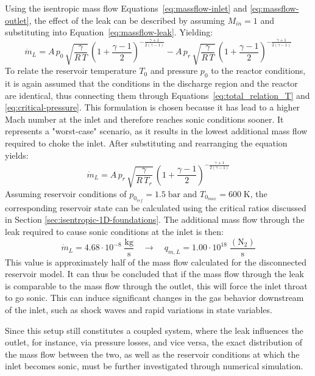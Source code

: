 	Using the isentropic mass flow Equations~\eqref{eq:massflow-inlet} and \eqref{eq:massflow-outlet}, the effect of the leak can be described by assuming $M_{in} = 1$ and substituting into Equation~\eqref{eq:massflow-leak}.
	Yielding:
	$$
	    \dot{m}_L =
	    A\, p_0\, \sqrt{\frac{\gamma}{R\,T}}\, \left(1+\frac{\gamma-1}{2}\right)^{-\frac{\gamma+1}{2(\gamma-1)}}
	    - A\, p_r\, \sqrt{\frac{\gamma}{R\,T}}\, \left(1+\frac{\gamma-1}{2}\right)^{-\frac{\gamma+1}{2(\gamma-1)}}
	$$
	To relate the reservoir temperature $T_0$ and pressure $p_0$ to the reactor conditions, it is again assumed that the conditions in the discharge region and the reactor are identical, thus connecting them through Equations~\eqref{eq:total_relation_T} and \eqref{eq:critical-pressure}.
	This formulation is chosen because it has lead to a higher Mach number at the inlet and therefore reaches sonic conditions sooner.
	It represents a "worst-case" scenario, as it results in the lowest additional mass flow required to choke the inlet.
	After substituting and rearranging the equation yields:
	\begin{equation}
	    \dot{m}_L =
	    A\, p_r\, \sqrt{\frac{\gamma}{R\, T_r}}\,
	    \left(1 + \frac{\gamma - 1}{2}\right)^{-\frac{\gamma + 1}{2(\gamma - 1)}}
	\end{equation}
	Assuming reservoir conditions of $p_{0_{ref}} = 1.5\;\text{bar}$ and $T_{0_{max}} = 600\;\text{K}$, the corresponding reservoir state can be calculated using the critical ratios discussed in Section \ref{sec:isentropic-1D-foundations}.
	The additional mass flow through the leak required to cause sonic conditions at the inlet is then:
	$$
	    \dot{m}_L = 4.68 \cdot 10^{-8} \; \frac{\text{kg}}{\text{s}}
			\quad \rightarrow \quad
		q_{m,L} = 1.00 \cdot 10^{18} \; \frac{(\text{N}_2)}{\text{s}}
	$$
	This value is approximately half of the mass flow calculated for the disconnected reservoir model.
	It can thus be concluded that if the mass flow through the leak is comparable to the mass flow through the outlet, this will force the inlet throat to go sonic.
	This can induce significant changes in the gas behavior downstream of the inlet, such as shock waves and rapid variations in state variables.

	Since this setup still constitutes a coupled system, where the leak influences the outlet, for instance, via pressure losses, and vice versa, the exact distribution of the mass flow between the two, as well as the reservoir conditions at which the inlet becomes sonic, must be further investigated through numerical simulation.
